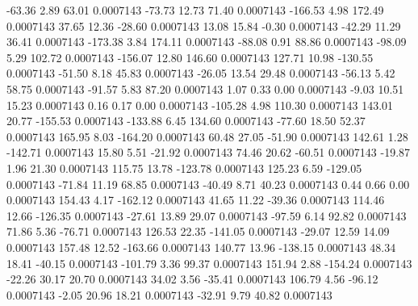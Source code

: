       -63.36        2.89       63.01     0.0007143
      -73.73       12.73       71.40     0.0007143
     -166.53        4.98      172.49     0.0007143
       37.65       12.36      -28.60     0.0007143
       13.08       15.84       -0.30     0.0007143
      -42.29       11.29       36.41     0.0007143
     -173.38        3.84      174.11     0.0007143
      -88.08        0.91       88.86     0.0007143
      -98.09        5.29      102.72     0.0007143
     -156.07       12.80      146.60     0.0007143
      127.71       10.98     -130.55     0.0007143
      -51.50        8.18       45.83     0.0007143
      -26.05       13.54       29.48     0.0007143
      -56.13        5.42       58.75     0.0007143
      -91.57        5.83       87.20     0.0007143
        1.07        0.33        0.00     0.0007143
       -9.03       10.51       15.23     0.0007143
        0.16        0.17        0.00     0.0007143
     -105.28        4.98      110.30     0.0007143
      143.01       20.77     -155.53     0.0007143
     -133.88        6.45      134.60     0.0007143
      -77.60       18.50       52.37     0.0007143
      165.95        8.03     -164.20     0.0007143
       60.48       27.05      -51.90     0.0007143
      142.61        1.28     -142.71     0.0007143
       15.80        5.51      -21.92     0.0007143
       74.46       20.62      -60.51     0.0007143
      -19.87        1.96       21.30     0.0007143
      115.75       13.78     -123.78     0.0007143
      125.23        6.59     -129.05     0.0007143
      -71.84       11.19       68.85     0.0007143
      -40.49        8.71       40.23     0.0007143
        0.44        0.66        0.00     0.0007143
      154.43        4.17     -162.12     0.0007143
       41.65       11.22      -39.36     0.0007143
      114.46       12.66     -126.35     0.0007143
      -27.61       13.89       29.07     0.0007143
      -97.59        6.14       92.82     0.0007143
       71.86        5.36      -76.71     0.0007143
      126.53       22.35     -141.05     0.0007143
      -29.07       12.59       14.09     0.0007143
      157.48       12.52     -163.66     0.0007143
      140.77       13.96     -138.15     0.0007143
       48.34       18.41      -40.15     0.0007143
     -101.79        3.36       99.37     0.0007143
      151.94        2.88     -154.24     0.0007143
      -22.26       30.17       20.70     0.0007143
       34.02        3.56      -35.41     0.0007143
      106.79        4.56      -96.12     0.0007143
       -2.05       20.96       18.21     0.0007143
      -32.91        9.79       40.82     0.0007143
